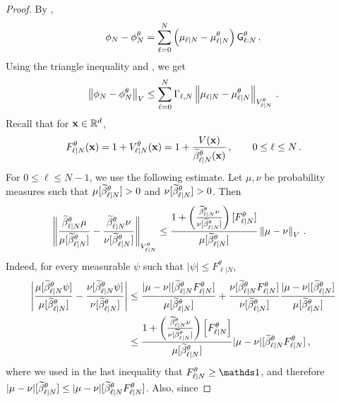 \documentclass[11pt]{article}
\theoremstyle{plain}
\theoremstyle{definition}
\theoremstyle{remark}
\begin{document}
\begin{proof}
By ,
$$
\filter{N}-\approxfilter{N}
= \sum_{\ell=0}^{N} \left(\muBias{\ell}{N} - \muBias{\ell}{N}[\theta] \right) \prodfsmk{\ell}{N}[\theta] \eqsp.
$$
Using the triangle inequality and , we get
$$
\vnorm[ \filter{N}-\approxfilter{N} ][V] \le \sum_{\ell=0}^{N}\Gamma_{\ell,N} \vnorm[ \muBias{\ell}{N}-\muBias{\ell}{N}[\theta] ][\twistedlyap{\ell}{N}[\theta]] \eqsp.
$$
Recall that for $\mathbf{x} \in \mathbb R^d$,
$$
F_{\ell|N}^{\theta} (\x) = 1+\twistedlyap{\ell}{N}[\theta] (\x)  = 1+ \frac{ V(\x) }{ \normbackwardfun{\ell}{N}[\theta](\x) } \eqsp, \qquad 0\le \ell\le N \eqsp.
$$
For $0\le \ell\le N-1$, we use the following estimate. Let $\mu,\nu$ be probability measures such that
$\mu[\normbackwardfun{\ell}{N}[\theta]] > 0$ and $\nu[\normbackwardfun{\ell}{N}[\theta]] > 0$. Then
\begin{align}
\label{eq:twisting_estimate_kernel_bias}
&\vnorm[ \frac{\normbackwardfun{\ell}{N}[\theta]\mu}{\mu[\normbackwardfun{\ell}{N}[\theta]]}
-
\frac{\normbackwardfun{\ell}{N}[\theta]\nu}{\nu[\normbackwardfun{\ell}{N}[\theta]]}][\twistedlyap{\ell}{N}[\theta]] 
\le \frac{ 1+\left( \frac{\normbackwardfun{\ell}{N}[\theta]\nu}{\nu[\normbackwardfun{\ell}{N}[\theta]]}\right)[F_{\ell|N}^{\theta}]}{ \mu[\normbackwardfun{\ell}{N}[\theta]]} \vnorm[\mu-\nu][V] \eqsp.
\end{align}
Indeed, for every measurable $\psi$ such that $|\psi|\le F_{\ell|N}^{\theta}$,
\begin{align*}
\left| \frac{\mu[\normbackwardfun{\ell}{N}[\theta]\psi]}{\mu[\normbackwardfun{\ell}{N}[\theta]]} - \frac{\nu[\normbackwardfun{\ell}{N}[\theta]\psi]}{\nu[\normbackwardfun{\ell}{N}[\theta]]} \right| 
& \le \frac{ |\mu-\nu|[\normbackwardfun{\ell}{N}[\theta]F_{\ell|N}^{\theta}]}{\mu[\normbackwardfun{\ell}{N}[\theta]]} + \frac{ \nu[\normbackwardfun{\ell}{N}[\theta]F_{\ell|N}^{\theta}] }{ \nu[\normbackwardfun{\ell}{N}[\theta]]} \frac{|\mu-\nu|[\normbackwardfun{\ell}{N}[\theta]] }{ \mu[\normbackwardfun{\ell}{N}[\theta]] } \\
& \le \frac{ 1+ \left( \frac{\normbackwardfun{\ell}{N}[\theta]\nu}{\nu[\normbackwardfun{\ell}{N}[\theta]]} \right) \left[ F_{\ell|N}^{\theta} \right] }{ \mu[\normbackwardfun{\ell}{N}[\theta]] } |\mu-\nu|[ \normbackwardfun{\ell}{N}[\theta]F_{\ell|N}^{\theta}] \eqsp,
\end{align*}
where we used in the last inequality that $F_{\ell|N}^{\theta}\ge \un$, and therefore $|\mu-\nu|[\normbackwardfun{\ell}{N}[\theta]] \le |\mu-\nu|[ \normbackwardfun{\ell}{N}[\theta]F_{\ell|N}^{\theta}]$. Also, since

\end{proof}
\end{document}

